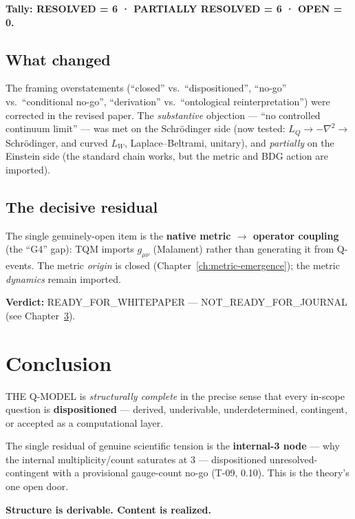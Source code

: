 \documentclass[11pt,twoside]{book}
\begin{document}
\textbf{Tally: RESOLVED = 6 · PARTIALLY RESOLVED = 6 · OPEN = 0.}

\section{What changed}

The framing overstatements (``closed'' vs.\ ``dispositioned'', ``no-go'' vs.\
``conditional no-go'', ``derivation'' vs.\ ``ontological reinterpretation'') were
corrected in the revised paper. The \emph{substantive} objection — ``no controlled
continuum limit'' — was met on the Schr\"odinger side (now tested: $L_Q\to-\nabla^2\to$
Schr\"odinger, and curved $L_W$, Laplace--Beltrami, unitary), and \emph{partially} on the
Einstein side (the standard chain works, but the metric and BDG action are imported).

\section{The decisive residual}

The single genuinely-open item is the \textbf{native metric $\to$ operator coupling} (the
``G4'' gap): TQM imports $g_{\mu\nu}$ (Malament) rather than generating it from Q-events.
The metric \emph{origin} is closed (Chapter~\ref{ch:metric-emergence}); the metric
\emph{dynamics} remain imported.

\textbf{Verdict:} READY\_FOR\_WHITEPAPER — NOT\_READY\_FOR\_JOURNAL (see
Chapter~\ref{ch:conclusion}).


\chapter{Conclusion}
\label{ch:conclusion}

THE Q-MODEL is \emph{structurally complete} in the precise sense that every in-scope
question is \textbf{dispositioned} — derived, underivable, underdetermined, contingent, or
accepted as a computational layer.

The single residual of genuine scientific tension is the \textbf{internal-3 node} — why the
internal multiplicity/count saturates at 3 — dispositioned unresolved-contingent with a
provisional gauge-count no-go (T-09, 0.10). This is the theory's one open door.

\textbf{Structure is derivable. Content is realized.}
\end{document}
